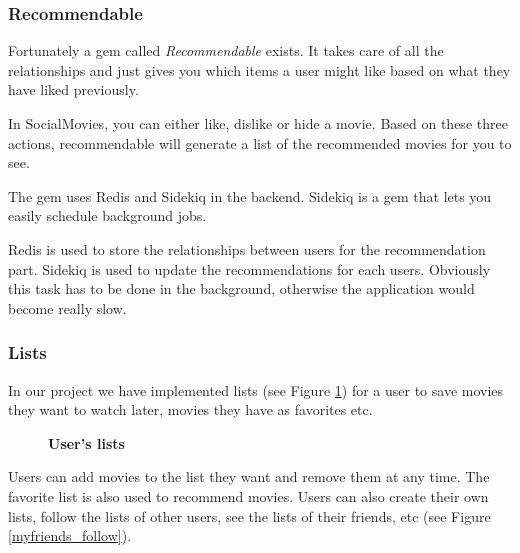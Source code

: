 \documentclass[12pt,a4paper]{article}
\begin{document}
\subsubsection{Recommendable}
Fortunately a gem called \textit{Recommendable} exists. It takes care of all the relationships and just gives you which items a user might like based on what they have liked previously.

In SocialMovies, you can either like, dislike or hide a movie. Based on these three actions, recommendable will generate a list of the recommended movies for you to see.

The gem uses Redis and Sidekiq in the backend. Sidekiq is a gem that lets you easily schedule background jobs.

Redis is used to store the relationships between users for the recommendation part. Sidekiq is used to update the recommendations for each users. Obviously this task has to be done in the background, otherwise the application would become really slow.

\subsubsection{Lists}
In our project we have implemented lists (see Figure \ref{mylists}) for a user to save movies they want to watch later, movies they have as favorites etc.

\begin{figure}[h]
\begin{center}
\end{center}
\caption{\textbf{User's lists}}
\label{mylists}
\end{figure}

Users can add movies to the list they want and remove them at any time. The favorite list is also used to recommend movies. Users can also create their own lists, follow the lists of other users, see the lists of their friends, etc (see Figure \ref{myfriends_follow}).
\end{document}
